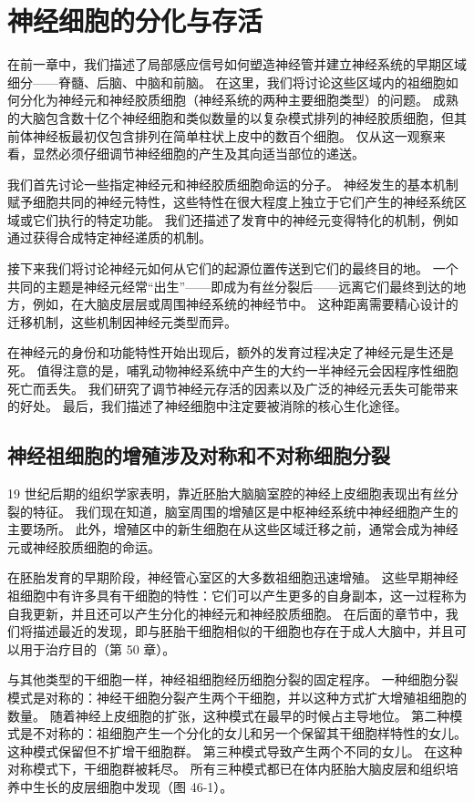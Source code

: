 \chapter{神经细胞的分化与存活}
在前一章中，我们描述了局部感应信号如何塑造神经管并建立神经系统的早期区域细分——脊髓、后脑、中脑和前脑。 在这里，我们将讨论这些区域内的祖细胞如何分化为神经元和神经胶质细胞（神经系统的两种主要细胞类型）的问题。 成熟的大脑包含数十亿个神经细胞和类似数量的以复杂模式排列的神经胶质细胞，但其前体神经板最初仅包含排列在简单柱状上皮中的数百个细胞。 仅从这一观察来看，显然必须仔细调节神经细胞的产生及其向适当部位的递送。

我们首先讨论一些指定神经元和神经胶质细胞命运的分子。 神经发生的基本机制赋予细胞共同的神经元特性，这些特性在很大程度上独立于它们产生的神经系统区域或它们执行的特定功能。 我们还描述了发育中的神经元变得特化的机制，例如通过获得合成特定神经递质的机制。

接下来我们将讨论神经元如何从它们的起源位置传送到它们的最终目的地。 一个共同的主题是神经元经常“出生”——即成为有丝分裂后——远离它们最终到达的地方，例如，在大脑皮层层或周围神经系统的神经节中。 这种距离需要精心设计的迁移机制，这些机制因神经元类型而异。

在神经元的身份和功能特性开始出现后，额外的发育过程决定了神经元是生还是死。 值得注意的是，哺乳动物神经系统中产生的大约一半神经元会因程序性细胞死亡而丢失。 我们研究了调节神经元存活的因素以及广泛的神经元丢失可能带来的好处。 最后，我们描述了神经细胞中注定要被消除的核心生化途径。

\section{神经祖细胞的增殖涉及对称和不对称细胞分裂}
19 世纪后期的组织学家表明，靠近胚胎大脑脑室腔的神经上皮细胞表现出有丝分裂的特征。 我们现在知道，脑室周围的增殖区是中枢神经系统中神经细胞产生的主要场所。 此外，增殖区中的新生细胞在从这些区域迁移之前，通常会成为神经元或神经胶质细胞的命运。

在胚胎发育的早期阶段，神经管心室区的大多数祖细胞迅速增殖。 这些早期神经祖细胞中有许多具有干细胞的特性：它们可以产生更多的自身副本，这一过程称为自我更新，并且还可以产生分化的神经元和神经胶质细胞。 在后面的章节中，我们将描述最近的发现，即与胚胎干细胞相似的干细胞也存在于成人大脑中，并且可以用于治疗目的（第 50 章）。

与其他类型的干细胞一样，神经祖细胞经历细胞分裂的固定程序。 一种细胞分裂模式是对称的：神经干细胞分裂产生两个干细胞，并以这种方式扩大增殖祖细胞的数量。 随着神经上皮细胞的扩张，这种模式在最早的时候占主导地位。 第二种模式是不对称的：祖细胞产生一个分化的女儿和另一个保留其干细胞样特性的女儿。 这种模式保留但不扩增干细胞群。 第三种模式导致产生两个不同的女儿。 在这种对称模式下，干细胞群被耗尽。 所有三种模式都已在体内胚胎大脑皮层和组织培养中生长的皮层细胞中发现（图 46-1）。

